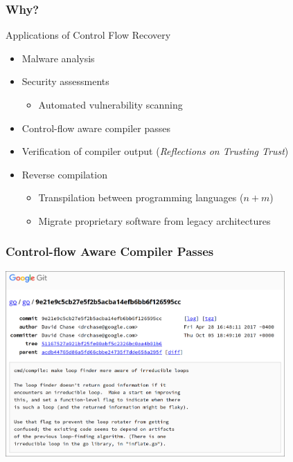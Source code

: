 \documentclass[aspectratio=1610]{beamer}
\begin{document}



\begin{frame}
	\frametitle{Why?}

	\begin{block}{Applications of Control Flow Recovery}
		\begin{itemize}
			\item Malware analysis
			\item Security assessments
			\begin{itemize}
				\item Automated vulnerability scanning
			\end{itemize}
			\item Control-flow aware compiler passes
			\item Verification of compiler output (\textit{Reflections on Trusting Trust})
			\item Reverse compilation
			\begin{itemize}
				\item Transpilation between programming languages ($n + m$)
				\item Migrate proprietary software from legacy architectures
			\end{itemize}
		\end{itemize}
	\end{block}
\end{frame}

\begin{frame}
	\frametitle{Control-flow Aware Compiler Passes}

	\includegraphics[width=0.8\textwidth]{inc/applications/loop_finder.png}
\end{frame}
\end{document}
